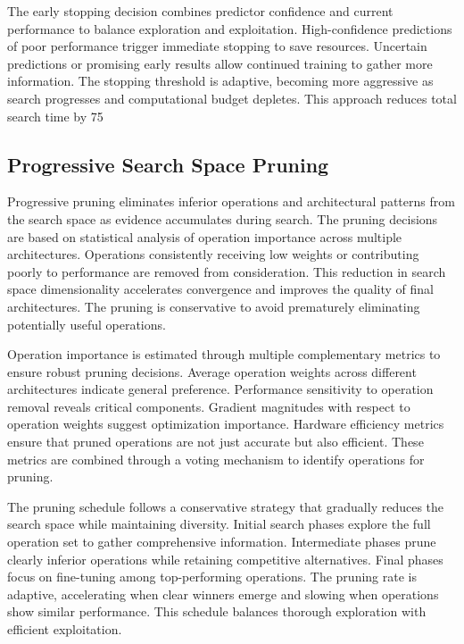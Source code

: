 \documentclass[journal]{IEEEtran}
\begin{document}
The early stopping decision combines predictor confidence and current performance to balance exploration and exploitation. High-confidence predictions of poor performance trigger immediate stopping to save resources. Uncertain predictions or promising early results allow continued training to gather more information. The stopping threshold is adaptive, becoming more aggressive as search progresses and computational budget depletes. This approach reduces total search time by 75%

\subsection{Progressive Search Space Pruning}

Progressive pruning eliminates inferior operations and architectural patterns from the search space as evidence accumulates during search. The pruning decisions are based on statistical analysis of operation importance across multiple architectures. Operations consistently receiving low weights or contributing poorly to performance are removed from consideration. This reduction in search space dimensionality accelerates convergence and improves the quality of final architectures. The pruning is conservative to avoid prematurely eliminating potentially useful operations.

Operation importance is estimated through multiple complementary metrics to ensure robust pruning decisions. Average operation weights across different architectures indicate general preference. Performance sensitivity to operation removal reveals critical components. Gradient magnitudes with respect to operation weights suggest optimization importance. Hardware efficiency metrics ensure that pruned operations are not just accurate but also efficient. These metrics are combined through a voting mechanism to identify operations for pruning.

The pruning schedule follows a conservative strategy that gradually reduces the search space while maintaining diversity. Initial search phases explore the full operation set to gather comprehensive information. Intermediate phases prune clearly inferior operations while retaining competitive alternatives. Final phases focus on fine-tuning among top-performing operations. The pruning rate is adaptive, accelerating when clear winners emerge and slowing when operations show similar performance. This schedule balances thorough exploration with efficient exploitation.
\end{document}
